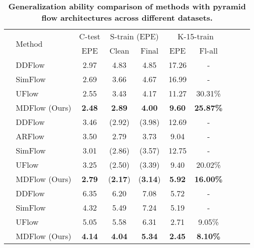 \documentclass[lettersize,journal]{IEEEtran}
\begin{document}
\begin{table*}[t]
	\caption{\textbf{Generalization ability comparison of methods with pyramid flow architectures across different datasets.}}
	\label{tab:5}
	\centering
	\renewcommand{\arraystretch}{1.1}
	\tabcolsep=8.6mm
	\begin{tabular}{llcccccccc}
		\toprule
		\multirow{2}{*}{} & \multirow{2}{*}{Method} & C-test & \multicolumn{2}{c}{S-train (EPE)} & \multicolumn{2}{c}{K-15-train} \\
		\cmidrule(lr){3-3}
		\cmidrule(lr){4-5}
		\cmidrule(lr){6-7}
		& & EPE & Clean & Final & EPE & Fl-all \\
		\midrule
		\parbox[t]{2mm}{}
		& DDFlow~\cite{Liu:2019:DDFlow} &2.97 & 4.83 & 4.85 & 17.26 & - \\
		& SimFlow~\cite{10.1007/978-3-030-58586-0_11} & 2.69 & 3.66 & 4.67 & 16.99 & - \\
		& UFlow~\cite{10.1007/978-3-030-58536-5_33} & 2.55 & 3.43 & 4.17 & 11.27 & 30.31\% \\
		& MDFlow (Ours) & \textbf{2.48} & \textbf{2.89} & \textbf{4.00} & \textbf{9.60} & \textbf{25.87\%} \\
		\hline
		\parbox[t]{2mm}{}
		& DDFlow~\cite{Liu:2019:DDFlow} & 3.46 & (2.92) & (3.98) & 12.69 & - \\
		& ARFlow~\cite{Liu_2020_CVPR} & 3.50 & 2.79 & 3.73 & 9.04 & - \\
		& SimFlow~\cite{10.1007/978-3-030-58586-0_11} & 3.01 & (2.86) & (3.57) & 12.75 & - \\
		& UFlow~\cite{10.1007/978-3-030-58536-5_33} & 3.25 & (2.50) & (3.39) & 9.40 & 20.02\% \\
		& MDFlow (Ours) & \textbf{2.79} & (\textbf{2.17}) & (\textbf{3.14}) & \textbf{5.92} & \textbf{16.00\%} \\
		\hline
		\parbox[t]{2mm}{}
		& DDFlow~\cite{Liu:2019:DDFlow} & 6.35 & 6.20 & 7.08 & 5.72 & - \\
		& SimFlow~\cite{10.1007/978-3-030-58586-0_11} & 4.32 & 5.49 & 7.24 & 5.19 & - \\
		& UFlow~\cite{10.1007/978-3-030-58536-5_33} & 5.05 & 5.58 & 6.31 & 2.71 & 9.05\% \\
		& MDFlow (Ours) & \textbf{4.14} & \textbf{4.04} & \textbf{5.34} & \textbf{2.45} & \textbf{8.10\%} \\
		\bottomrule
	\end{tabular}
\end{table*}
\end{document}
